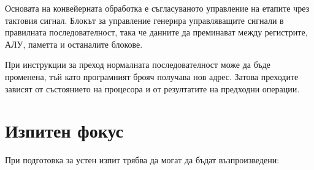 Основата на конвейерната обработка е съгласуваното управление на етапите чрез тактовия сигнал. Блокът за управление генерира управляващите сигнали в правилната последователност, така че данните да преминават между регистрите, АЛУ, паметта и останалите блокове.

При инструкции за преход нормалната последователност може да бъде променена, тъй като програмният брояч получава нов адрес. Затова преходите зависят от състоянието на процесора и от резултатите на предходни операции.

\section{Изпитен фокус}\label{s:9.6}

При подготовка за устен изпит трябва да могат да бъдат възпроизведени:

